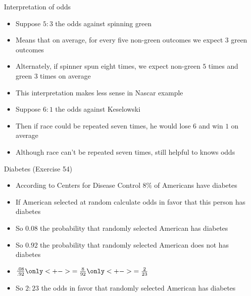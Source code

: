 \documentclass{beamer}
\theoremstyle{definition}
\begin{document}
\begin{frame}{Interpretation of odds} 
\begin{itemize}
\item Suppose $5:3$ the odds against spinning green
\item Means that on average, for every five non-green outcomes
we expect $3$ green outcomes
\item Alternately, if spinner spun eight times, we expect
non-green $5$ times and green $3$ times on average
\item This interpretation makes less sense in Nascar example
\item Suppose $6:1$ the odds against Keselowski
\item Then if race could be repeated seven times, he would
lose $6$ and win $1$ on average
\item Although race can't be repeated seven times,
still helpful to knows odds
\end{itemize}
\end{frame}

\begin{frame}{Diabetes (Exercise 54)}
\begin{itemize}
\item According to Centers for Disease Control
$8\%$ of Americans have diabetes
\item If American selected at random
calculate odds in favor that this person has diabetes
\item So $0.08$ the probability that randomly selected
American has diabetes
\item So $0.92$ the probability that randomly selected
American \alert{does not} has diabetes
\item $\frac{.08}{.92}
\only<+->{=\frac{8}{92}}
\only<+->{=\frac{2}{23}}$
\item So $2:23$ the odds in favor that randomly
selected American has diabetes
\end{itemize}
\end{frame}
\end{document}
